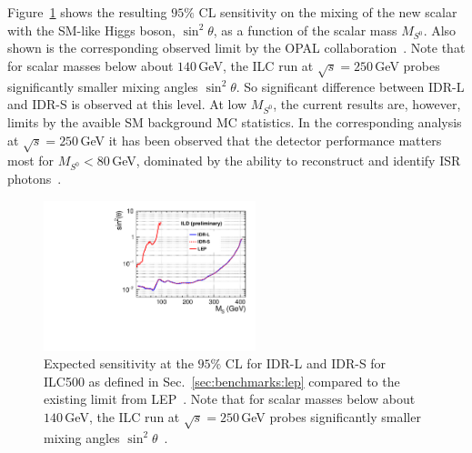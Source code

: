 % 

Figure~\ref{fig:extraH:limit} shows the resulting $95\%$ CL sensitivity on the mixing of the new scalar with the SM-like Higgs boson, $\sin^2{\theta}$, as a function of the scalar mass $M_{S^0}$. Also shown is the corresponding observed limit by the OPAL collaboration~\cite{Abbiendi:2002qp}. Note that for scalar masses below about $140$\,GeV, the ILC run at $\sqrt{s}=250$\,GeV probes significantly smaller mixing angles $\sin^2{\theta}$. So significant difference between IDR-L and IDR-S is observed at this level. At low $M_{S^0}$, the current results are, however, limits by the avaible SM background MC statistics. In the corresponding analysis at $\sqrt{s}=250$\,GeV it has been observed that the detector performance matters most for $M_{S^0}<80$\,GeV, dominated by the ability to reconstruct and identify ISR photons~\cite{FIPnote:ESU_BSM}.

\begin{figure}[htbp]
\begin{center} 
\includegraphics[width=0.55\textwidth]{Performance/fig/exclusion_limits_compare_LEP.pdf}
\end{center}
\caption{Expected sensitivity at the $95\%$ CL for IDR-L and IDR-S for ILC500 as defined in Sec.~\ref{sec:benchmarks:lep} compared to the existing limit from LEP~\cite{Abbiendi:2002qp}. Note that for scalar masses below about $140$\,GeV, the ILC run at $\sqrt{s}=250$\,GeV probes significantly smaller mixing angles $\sin^2{\theta}$~\cite{FIPnote:ESU_BSM}.}
\label{fig:extraH:limit}
\end{figure}



